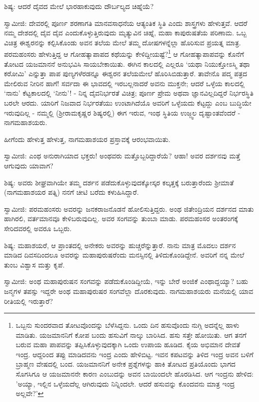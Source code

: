 ಶಿಷ್ಯ: ಆದರೆ ದೈವದ ಮೇಲೆ ಭಾರಹಾಕುವುದು ದೌರ್ಬಲ್ಯದ ಚಿಹ್ನೆಯೆ?

ಸ್ವಾಮೀಜಿ: ದೇವರಲ್ಲಿ ಪೂರ್ಣ ಶರಣಾಗತಿ ಮಾನವಸಾಧನೆಯ ಆತ್ಯಂತಿಕ ಸ್ಥಿತಿ ಎಂದು ಶಾಸ್ತ್ರಗಳು ಹೇಳುತ್ತವೆ. ಆದರೆ ನಮ್ಮ ದೇಶದಲ್ಲಿ ದೈವ ದೈವ ಎಂದುಕೊಳ್ಳುತ್ತಿರುವುದು ಮೃತ್ಯುವಿನ ಚಿಹ್ನೆ, ಮಹಾ ಕಾಪುರುಷತೆಯ ಪರಿಣಾಮ. ಒಬ್ಬ ವಿಚಿತ್ರ ಈಶ್ವರನನ್ನು ಕಲ್ಪಿಸಿಕೊಂಡು ಅವನ ತಲೆಯ ಮೇಲೆ ತಮ್ಮ ದೋಷಗಳನ್ನೆಲ್ಲಾ ಹೊರಿಸುವ ಪ್ರಯತ್ನ ಮಾತ್ರ. ಪರಮಹಂಸರು ಹೇಳುತ್ತಿದ್ದ ಆ ಗೋಹತ್ಯಾಪಾಪದ ಕಥೆಯನ್ನು ಕೇಳಿದ್ದೀಯಷ್ಟೆ?\footnote{ಒಬ್ಬನು ಸುಂದರವಾದ ತೋಟವೊಂದನ್ನು ಬೆಳೆಸಿದ್ದನು. ಒಂದು ದಿನ ಹಸುವೊಂದು ನುಗ್ಗಿ ಅದನ್ನೆಲ್ಲ ಹಾಳು ಮಾಡಿತು. ಯಜಮಾನನಿಗೆ ಕೋಪ ಬಂದು ಹಸುವಿಗೆ ನಾಲ್ಕು ಬಾರಿಸಿದ. ಹಸು ಸತ್ತೇ ಹೋಯಿತು. ಆಗ ತನಗೆ ಬರುವ ಮಹಾ ಪಾಪವನ್ನು ತಪ್ಪಿಸಿಕೊಳ್ಳುವುದಕ್ಕಾಗಿ ಒಂದು ಉಪಾಯ ಹೂಡಿದ. ಕೈಯ ಅಭಿಮಾನ ದೇವತೆ ಇಂದ್ರ. ಆದ್ದರಿಂದ ತಪ್ಪು ಮಾಡಿದವನು ಇಂದ್ರ ಎಂದು ಹೇಳಿಬಿಟ್ಟ. ಇವನ ಕಪಟವನ್ನು ತಿಳಿದ ಇಂದ್ರ ಅವನ ಬಳಿಗೆ ಬ್ರಾಹ್ಮಣ ವೇಷದಲ್ಲಿ ಬಂದ. ಯಜಮಾನನಿಗೆ ಅನೇಕ ಪ್ರಶ್ನೆಗಳನ್ನು ಹಾಕಿ ತೋಟದ ಪ್ರತಿಯೊಂದು ಭಾಗದ ಸೊಗಸಿಗೂ ಆ ಯಜಮಾನನೇ ಕಾರಣ ಎಂಬುದನ್ನು ಅವನ ಬಾಯಿಂದಲೇ ಹೊರಡಿಸಿದ. ಆಗ ಇಂದ್ರನು ಹೇಳಿದ: 'ಅಯ್ಯಾ, ಇಲ್ಲಿನ ಒಳ್ಳೆಯದೆಲ್ಲ ಆಗಿರುವುದು ನಿನ್ನಿಂದಲೇ. ಆದರೆ ಹಸುವನ್ನು ಕೊಂದವನು ಮಾತ್ರ ಇಂದ್ರ ಅಲ್ಲವೇ?'} ಆ ಗೋಹತ್ಯಾಪಾಪವನ್ನು ಕೊನೆಗೆ ತೋಟದ ಯಜಮಾನನೆ ಅನುಭವಿಸಿ ಸಾಯಬೇಕಾಯಿತು. ಈಗಿನ ಕಾಲದಲ್ಲಿ ಎಲ್ಲರೂ ‘ಯಥಾ ನಿಯುಕ್ತೋಽಸ್ಮಿ ತಥಾ ಕರೋಮಿ’ ಎನ್ನುತ್ತಾ ಪಾಪ ಪುಣ್ಯಗಳೆರಡನ್ನೂ ಈಶ್ವರನ ತಲೆಯಮೇಲೆ ಹೊರಿಸಿಬಿಡುತ್ತಾರೆ. ತಾವೇನೊ ಪದ್ಮ ಪತ್ರದ ಮೇಲಿರುವ ನೀರಿನ ಹಾಗೆ! ಸರ್ವದಾ ಈ ಭಾವದಲ್ಲಿ ಇರಬಲ್ಲನಾದರೆ ಅವನು ಮುಕ್ತನೇ; ಆದರೆ ಒಳ್ಳೆಯ ಕಾಲದಲ್ಲಿ ‘ನಾನು’ ಕೆಟ್ಟಕಾಲದಲ್ಲಿ ‘ನೀನು’! - ನಿನ್ನ ದೈವನಿರ್ಭರತೆ ವಿಚಿತ್ರ; ಪೂರ್ಣ ಪ್ರೇಮ ಅಥವಾ ಜ್ಞಾನವಿಲ್ಲದಿದ್ದರೆ ನಿರ್ಭರಸ್ಥಿತಿ ಬರಲೇ ಆರದು. ಯಾರಿಗೆ ನಿಜವಾದ ನಿರ್ಭರತೆಯು ಉಂಟಾಗಿದೆಯೊ ಅವರಿಗೆ ಒಳ್ಳೆಯದು ಕೆಟ್ಟದ್ದು ಎಂಬ ಬುದ್ಧಿಯೇ ಇರುವುದಿಲ್ಲ - ನಮ್ಮಲ್ಲಿ (ಶ‍್ರೀರಾಮಕೃಷ್ಣರ ಶಿಷ್ಯರಲ್ಲಿ) ಈಗ ಇರುವ, ಇಂಥ ಸ್ಥಿತಿಯ ಉಜ್ಜ್ವಲ ದೃಷ್ಟಾಂತವೆಂದರೆ - ನಾಗಮಹಾಶಯರು.

ಹೀಗೆಂದು ಹೇಳುತ್ತ ಹೇಳುತ್ತ, ನಾಗಮಹಾಶಯರ ಪ್ರಸ್ತಾವಕ್ಕೆ ಆರಂಭವಾಯಿತು.

ಸ್ವಾಮೀಜಿ: ಎಂಥ ಅನುರಾಗಿಯಾದ ಭಕ್ತರು! ಅಂಥವರು ಮತ್ತೊಬ್ಬರಿದ್ದಾರೆಯೆ? ಆಹಾ! ಅವರ ದರ್ಶನವು ಮತ್ತೆ ಆಗುವುದು ಯಾವಾಗ?

ಶಿಷ್ಯ: ಅವರು ಶೀಘ್ರವಾಗಿಯೇ ತಮ್ಮ ದರ್ಶನ ಪಡೆದುಕೊಳ್ಳುವುದಕ್ಕೋಸ್ಕರ ಕಲ್ಕತ್ತಕ್ಕೆ ಬರುತ್ತಾರೆಂದು ಶ‍್ರೀಮಾತೆ (ನಾಗಮಹಾಶಯರ ಪತ್ನಿ) ನನಗೆ ಚೀಟಿ ಬರೆದು ಕಳುಹಿಸಿದ್ದಾರೆ.

ಸ್ವಾಮೀಜಿ: ಪರಮಹಂಸರು ಅವರನ್ನು ಜನಕರಾಜನೊಡನೆ ಹೋಲಿಸುತ್ತಿದ್ದರು. ಅಂಥ ಜಿತೇಂದ್ರಿಯನ ದರ್ಶನದ ಮಾತು ಹಾಗಿರಲಿ, ವರ್ತಮಾನವೂ ಕೇಳಿಬರುವುದಿಲ್ಲ. ಅವರ ಸಂಗವನ್ನು ತುಂಬಾ ಮಾಡು. ಪರಮಹಂಸರ ಅಂತರಂಗಕ್ಕೆ ಸೇರಿದವರಲ್ಲಿ ಅವರೂ ಒಬ್ಬರು.

ಶಿಷ್ಯ: ಮಹಾಶಯರೆ, ಆ ಪ್ರಾಂತದಲ್ಲಿ ಅನೇಕರು ಅವರನ್ನು ಹುಚ್ಚರೆನ್ನುತ್ತಾರೆ. ನಾನು ಮಾತ್ರ ಮೊದಲು ದರ್ಶನ ಮಾಡಿದ ದಿವಸದಿಂದಲೂ ಅವರನ್ನು ಮಹಾಪುರುಷರೆಂದು ಮನಸ್ಸಿನಲ್ಲಿ ತಿಳಿದುಕೊಂಡಿದ್ದೇನೆ. ಅವರಿಗೆ ನನ್ನ ಮೇಲೆ ತುಂಬ ವಿಶ್ವಾಸ ಮತ್ತು ಕೃಪೆ.

ಸ್ವಾಮೀಜಿ: ಅಂಥ ಮಹಾಪುರುಷನ ಸಂಗವನ್ನು ಪಡೆದುಕೊಂಡಿದ್ದೀಯೆ, ಇನ್ನು ಬೇರೆ ಅಂಜಿಕೆ ಎಂಥಾದ್ದಯ್ಯಾ? ಬಹು ಜನ್ಮಗಳ ತಪಸ್ಸು ಇದ್ದರೇ ಅಂಥ ಮಹಾಪುರುಷರ ಸಂಗವೆಲ್ಲಾ ದೊರಕುವುದು. ನಾಗಮಹಾಶಯರು ಮನೆಯಲ್ಲಿ ಯಾವ ರೀತಿಯಲ್ಲಿ ಇರುತ್ತಾರೆ?

